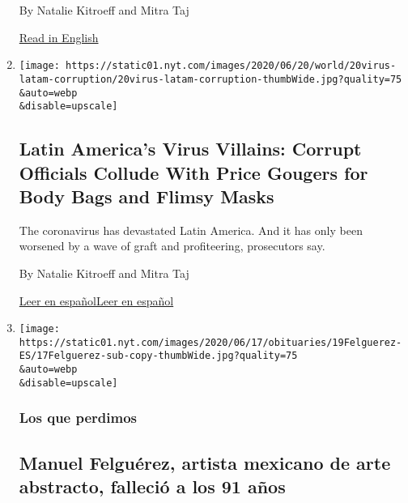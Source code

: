 \begin{enumerate}
  By Natalie Kitroeff and Mitra Taj

  \href{https://www.nytimes.com/2020/06/20/world/americas/coronavirus-latin-america-corruption.html}{Read
  in English}
\item
  \href{/2020/06/20/world/americas/coronavirus-latin-america-corruption.html}{}

  \texttt{[image: https://static01.nyt.com/images/2020/06/20/world/20virus-latam-corruption/20virus-latam-corruption-thumbWide.jpg?quality=75\\\&auto=webp\\\&disable=upscale]}

  \hypertarget{latin-americas-virus-villains-corrupt-officials-collude-with-price-gougers-for-body-bags-and-flimsy-masks}{%
  \subsection{Latin America's Virus Villains: Corrupt Officials Collude
  With Price Gougers for Body Bags and Flimsy
  Masks}\label{latin-americas-virus-villains-corrupt-officials-collude-with-price-gougers-for-body-bags-and-flimsy-masks}}

  The coronavirus has devastated Latin America. And it has only been
  worsened by a wave of graft and profiteering, prosecutors say.

  By Natalie Kitroeff and Mitra Taj

  \href{https://www.nytimes.com/es/2020/06/20/espanol/america-latina/corrupcion-coronavirus-latinoamerica.html}{Leer
  en
  español}\href{https://www.nytimes.com/es/2020/06/20/espanol/america-latina/corrupcion-coronavirus-latinoamerica.html}{Leer
  en español}
\item
  \href{/es/2020/06/18/espanol/cultura/muere-covid-manuel-felguerez.html}{}

  \texttt{[image: https://static01.nyt.com/images/2020/06/17/obituaries/19Felguerez-ES/17Felguerez-sub-copy-thumbWide.jpg?quality=75\\\&auto=webp\\\&disable=upscale]}

  \hypertarget{los-que-perdimos}{%
  \subsubsection{Los que perdimos}\label{los-que-perdimos}}

  \hypertarget{manuel-felguuxe9rez-artista-mexicano-de-arte-abstracto-falleciuxf3-a-los-91-auxf1os}{%
  \subsection{Manuel Felguérez, artista mexicano de arte abstracto,
  falleció a los 91
  años}\label{manuel-felguuxe9rez-artista-mexicano-de-arte-abstracto-falleciuxf3-a-los-91-auxf1os}}


\end{enumerate}
